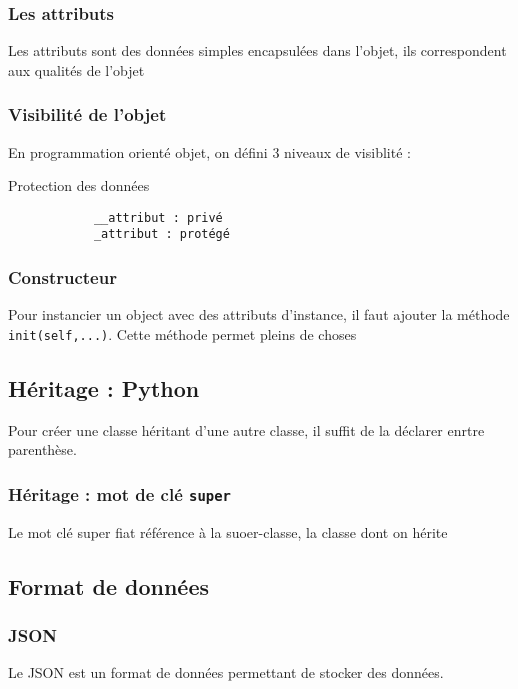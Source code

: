 \documentclass[12pt, a4paper]{article}
\begin{document}
    \subsubsection{Les attributs}
        Les attributs sont des données simples encapsulées dans l'objet, ils
        correspondent aux qualités de l'objet

    \subsubsection{Visibilité de l'objet}
        En programmation orienté objet, on défini 3 niveaux de visiblité :
        \begin{listing}[H]
            \caption{Protection des données}
            \label{lst:settings}
            \begin{verbatim}
            __attribut : privé
            _attribut : protégé
            \end{verbatim}
        \end{listing}
   
    \subsubsection{Constructeur}
    Pour instancier un object avec des attributs d'instance, il faut ajouter la
    méthode \texttt{init(self,...)}.
    Cette méthode permet pleins de choses

    \subsection{Héritage : Python}
    Pour créer une classe héritant d'une autre classe, il suffit de la 
    déclarer enrtre parenthèse. 

        \subsubsection{Héritage : mot de clé \texttt{super}}
        Le mot clé super fiat référence à la {suoer-classe}, la classe dont on 
        hérite

    \subsection{Format de données}
        \subsubsection{JSON}
        Le JSON est un format de données permettant de stocker des données. 
\end{document}
